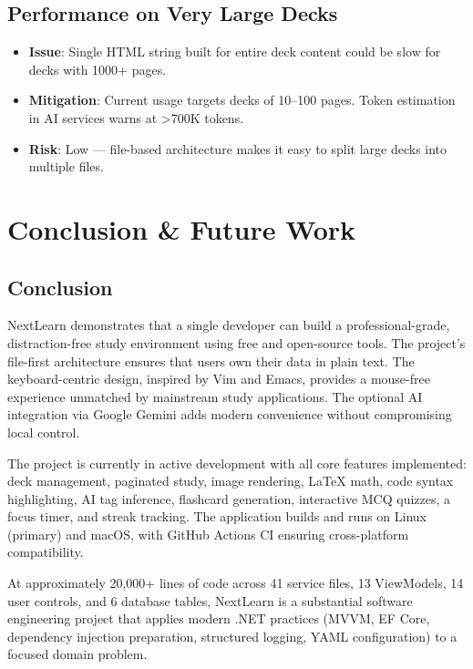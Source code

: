 \documentclass[14pt]{article}
\begin{document}
\subsection{Performance on Very Large Decks}
\label{sec:orge71b34c}
\begin{itemize}
\item \textbf{\textbf{Issue}}: Single HTML string built for entire deck content could
be slow for decks with 1000+ pages.
\item \textbf{\textbf{Mitigation}}: Current usage targets decks of 10--100 pages.
Token estimation in AI services warns at >700K tokens.
\item \textbf{\textbf{Risk}}: Low — file-based architecture makes it easy to split
large decks into multiple files.
\end{itemize}

\newpage
\section{Conclusion \& Future Work}
\label{sec:orgd2232c5}
\subsection{Conclusion}
\label{sec:org182b13f}
\begin{center}
NextLearn demonstrates that a single developer can build a
professional-grade, distraction-free study environment using free and
open-source tools. The project's file-first architecture ensures that
users own their data in plain text. The keyboard-centric design,
inspired by Vim and Emacs, provides a mouse-free experience unmatched
by mainstream study applications. The optional AI integration via
Google Gemini adds modern convenience without compromising local
control.
\end{center}


\begin{center}
The project is currently in active development with all core features
implemented: deck management, paginated study, image rendering, LaTeX
math, code syntax highlighting, AI tag inference, flashcard
generation, interactive MCQ quizzes, a focus timer, and streak
tracking. The application builds and runs on Linux (primary) and
macOS, with GitHub Actions CI ensuring cross-platform compatibility.
\end{center}


\begin{center}
At approximately 20,000+ lines of code across 41 service files, 13
ViewModels, 14 user controls, and 6 database tables, NextLearn is a
substantial software engineering project that applies modern .NET
practices (MVVM, EF Core, dependency injection preparation, structured
logging, YAML configuration) to a focused domain problem.
\end{center}
\end{document}

